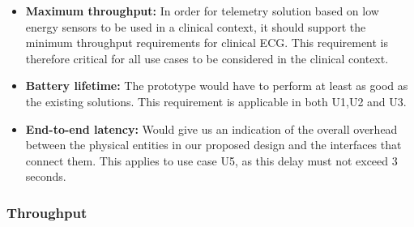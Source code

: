 \begin{itemize}
	\item \textbf{Maximum throughput:} In order for telemetry solution based on low energy sensors to be used in a clinical context, it should support the minimum throughput requirements for clinical ECG. This requirement is therefore critical for all use cases to be considered in the clinical context.
  	\item \textbf{Battery lifetime:} The prototype would have to perform at least as good as the existing solutions. This requirement is applicable in both U1,U2 and U3. 
  	\item \textbf{End-to-end latency:} Would give us an indication of the overall overhead between the physical entities in our proposed design and the interfaces that connect them. This applies to use case U5, as this delay must not exceed 3 seconds.
\end{itemize}
\noindent

\subsubsection{Throughput} %
\label{ssub:throughput}

